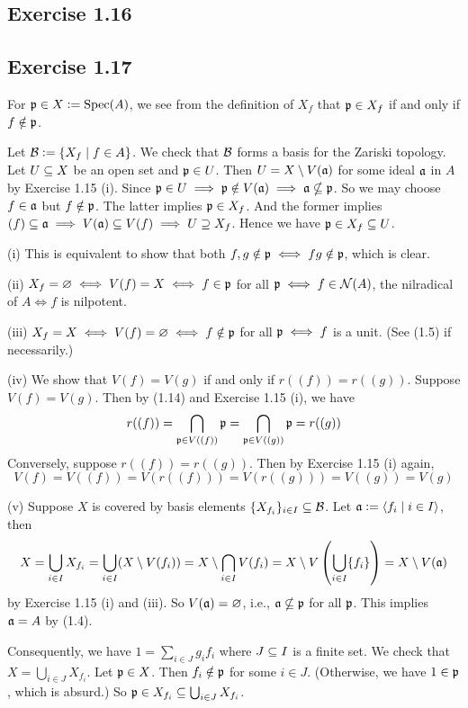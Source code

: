 \documentclass[../A&M.tex]{subfiles}
\begin{document}
\subsection*{Exercise 1.16}

\subsection*{Exercise 1.17}

For $\mathfrak{p}\in X:=\operatorname{Spec}(A)$, we see from the definition of $X_f$ that $\mathfrak{p}\in X_f$ if and only if $f\notin\mathfrak{p}$.

Let $\mathcal{B}:=\{ X_f \mid f\in A\}$. We check that $\mathcal{B}$ forms a basis for the Zariski topology. Let $U\subseteq X$ be an open set and $\mathfrak{p}\in U$. Then $U=X \setminus V(\mathfrak{a})$ for some ideal $\mathfrak{a}$ in $A$ by Exercise 1.15 (i). Since $\mathfrak{p}\in U \implies \mathfrak{p}\notin V(\mathfrak{a}) \implies \mathfrak{a}\nsubseteq\mathfrak{p}$. So we may choose $f\in\mathfrak{a}$ but $f\notin\mathfrak{p}$. The latter implies $\mathfrak{p}\in X_f$. And the former implies $(f)\subseteq\mathfrak{a} \implies V(\mathfrak{a})\subseteq V(f) \implies U\supseteq X_f$. Hence we have $\mathfrak{p} \in X_f \subseteq U$.

(i) This is equivalent to show that both $f,g \notin \mathfrak{p} \iff fg \notin \mathfrak{p}$, which is clear.

(ii) $X_f=\varnothing \iff V(f)=X \iff f\in\mathfrak{p}$ for all $\mathfrak{p} \iff f\in \mathcal{N}(A)$, the nilradical of $A \iff f$ is nilpotent.

(iii) $X_f=X \iff V(f)=\varnothing \iff f\notin\mathfrak{p}$ for all $\mathfrak{p} \iff f$ is a unit. (See (1.5) if necessarily.)

(iv) We show that $V(f)=V(g)$ if and only if $r((f))=r((g))$. Suppose $V(f)=V(g)$. Then by (1.14) and Exercise 1.15 (i), we have
$$
r((f)) = \bigcap_{\mathfrak{p}\in V((f))} \mathfrak{p} = \bigcap_{\mathfrak{p}\in V((g))} \mathfrak{p} = r((g))
$$
Conversely, suppose $r((f))=r((g))$. Then by Exercise 1.15 (i) again,
$$
V(f) = V((f)) = V(r((f))) = V(r((g))) = V((g)) = V(g)
$$

(v) Suppose $X$ is covered by basis elements $\{X_{f_i}\}_{i\in I} \subseteq \mathcal{B}$. Let $\mathfrak{a}:=\langle f_i \mid i\in I \rangle$, then
$$
X = \bigcup_{i\in I} X_{f_i} = \bigcup_{i\in I} (X\setminus V(f_i)) = X\setminus  \bigcap_{i\in I} V(f_i) = X \setminus V\left( \bigcup_{i\in I} \{f_i\} \right) = X\setminus V(\mathfrak{a})
$$
by Exercise 1.15 (i) and (iii). So $V(\mathfrak{a})=\varnothing$, i.e., $\mathfrak{a}\nsubseteq\mathfrak{p}$ for all $\mathfrak{p}$. This implies $\mathfrak{a}=A$ by (1.4).

Consequently, we have $1=\sum_{i\in J} g_if_i$ where $J\subseteq I$ is a finite set. We check that $X=\bigcup_{i\in J} X_{f_i}$. Let $\mathfrak{p}\in X$. Then $f_i\notin \mathfrak{p}$ for some $i\in J$. (Otherwise, we have $1\in \mathfrak{p}$, which is absurd.) So $\mathfrak{p}\in X_{f_i} \subseteq \bigcup_{i\in J} X_{f_i}$.
\end{document}

